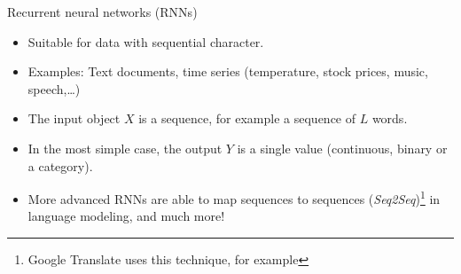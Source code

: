 \documentclass[
  10pt,
  ignorenonframetext,
]{beamer}
\providecommand{\tightlist}{%
  \setlength{\itemsep}{0pt}\setlength{\parskip}{0pt}}
\begin{document}
\begin{frame}{Recurrent neural networks (RNNs)}
\protect\hypertarget{recurrent-neural-networks-rnns}{}
\(~\)

\begin{itemize}
\tightlist
\item
  Suitable for data with sequential character.
\end{itemize}

\vspace{2mm}

\begin{itemize}
\tightlist
\item
  Examples: Text documents, time series (temperature, stock prices,
  music, speech,\ldots)
\end{itemize}

\vspace{2mm}

\begin{itemize}
\tightlist
\item
  The input object \(X\) is a sequence, for example a sequence of \(L\)
  words.
\end{itemize}

\vspace{2mm}

\begin{itemize}
\tightlist
\item
  In the most simple case, the output \(Y\) is a single value
  (continuous, binary or a category).
\end{itemize}

\vspace{2mm}

\begin{itemize}
\tightlist
\item
  More advanced RNNs are able to map sequences to sequences
  (\emph{Seq2Seq})\footnote{Google Translate uses this technique, for example}
  in language modeling, and much more!
\end{itemize}
\end{frame}
\end{document}
